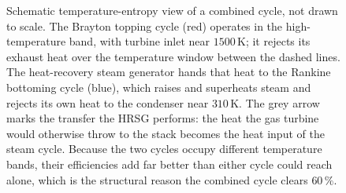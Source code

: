 \begin{figure}[htbp]
\caption[Combined-cycle temperature-entropy schematic]{Schematic
temperature-entropy view of a combined cycle, not drawn to scale. The Brayton
topping cycle (red) operates in the high-temperature band, with turbine inlet
near $1500\,$K; it rejects its exhaust heat over the temperature window between
the dashed lines. The heat-recovery steam generator hands that heat to the
Rankine bottoming cycle (blue), which raises and superheats steam and rejects
its own heat to the condenser near $310\,$K. The grey arrow marks the transfer
the HRSG performs: the heat the gas turbine would otherwise throw to the stack
becomes the heat input of the steam cycle. Because the two cycles occupy
different temperature bands, their efficiencies add far better than either
cycle could reach alone, which is the structural reason the combined cycle
clears $60\,\%$.}
\label{fig:vol04ch03:combined-cycle-ts}
\end{figure}
